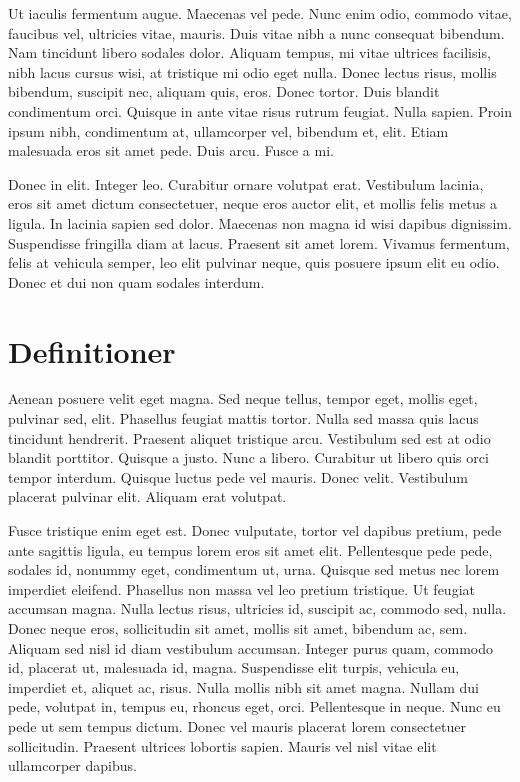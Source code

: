 \documentclass[a4paper,11pt]{kth-mag}
\begin{document}
Ut iaculis fermentum augue. Maecenas vel pede. Nunc enim odio, commodo
vitae, faucibus vel, ultricies vitae, mauris. Duis vitae nibh a nunc
consequat bibendum. Nam tincidunt libero sodales dolor. Aliquam
tempus, mi vitae ultrices facilisis, nibh lacus cursus wisi, at
tristique mi odio eget nulla. Donec lectus risus, mollis bibendum,
suscipit nec, aliquam quis, eros. Donec tortor. Duis blandit
condimentum orci. Quisque in ante vitae risus rutrum feugiat. Nulla
sapien. Proin ipsum nibh, condimentum at, ullamcorper vel, bibendum
et, elit. Etiam malesuada eros sit amet pede. Duis arcu. Fusce a mi.

Donec in elit. Integer leo. Curabitur ornare volutpat erat. Vestibulum
lacinia, eros sit amet dictum consectetuer, neque eros auctor elit, et
mollis felis metus a ligula. In lacinia sapien sed dolor. Maecenas non
magna id wisi dapibus dignissim. Suspendisse fringilla diam at lacus.
Praesent sit amet lorem. Vivamus fermentum, felis at vehicula semper,
leo elit pulvinar neque, quis posuere ipsum elit eu odio. Donec et dui
non quam sodales interdum.

\section{Definitioner}

Aenean posuere velit eget magna. Sed neque tellus, tempor eget, mollis
eget, pulvinar sed, elit. Phasellus feugiat mattis tortor. Nulla sed
massa quis lacus tincidunt hendrerit. Praesent aliquet tristique arcu.
Vestibulum sed est at odio blandit porttitor. Quisque a justo. Nunc a
libero. Curabitur ut libero quis orci tempor interdum. Quisque luctus
pede vel mauris. Donec velit. Vestibulum placerat pulvinar elit.
Aliquam erat volutpat.

Fusce tristique enim eget est. Donec vulputate, tortor vel dapibus
pretium, pede ante sagittis ligula, eu tempus lorem eros sit amet
elit. Pellentesque pede pede, sodales id, nonummy eget, condimentum
ut, urna. Quisque sed metus nec lorem imperdiet eleifend. Phasellus
non massa vel leo pretium tristique. Ut feugiat accumsan magna. Nulla
lectus risus, ultricies id, suscipit ac, commodo sed, nulla. Donec
neque eros, sollicitudin sit amet, mollis sit amet, bibendum ac, sem.
Aliquam sed nisl id diam vestibulum accumsan. Integer purus quam,
commodo id, placerat ut, malesuada id, magna. Suspendisse elit turpis,
vehicula eu, imperdiet et, aliquet ac, risus. Nulla mollis nibh sit
amet magna. Nullam dui pede, volutpat in, tempus eu, rhoncus eget,
orci. Pellentesque in neque. Nunc eu pede ut sem tempus dictum. Donec
vel mauris placerat lorem consectetuer sollicitudin. Praesent ultrices
lobortis sapien. Mauris vel nisl vitae elit ullamcorper dapibus.
\end{document}
